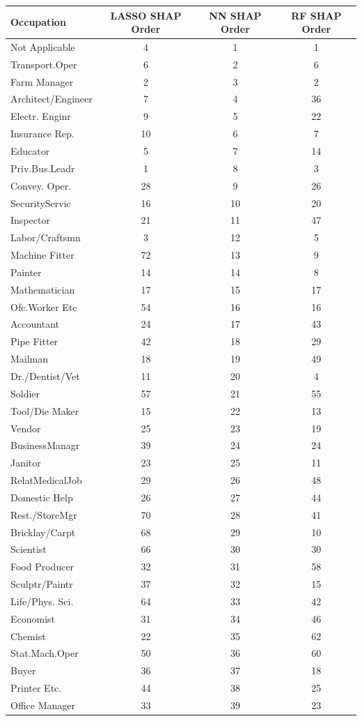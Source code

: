 \begin{tabular}{lccc}
\hline\hline
Occupation & LASSO SHAP Order & NN SHAP Order & RF SHAP Order \\
\hline
Not Applicable&4&1&1\\
Transport.Oper&6&2&6\\
Farm Manager&2&3&2\\
Architect/Engineer&7&4&36\\
Electr. Enginr&9&5&22\\
Insurance Rep.&10&6&7\\
Educator&5&7&14\\
Priv.Bus.Leadr&1&8&3\\
Convey. Oper.&28&9&26\\
SecurityServic&16&10&20\\
Inspector&21&11&47\\
Labor/Craftsmn&3&12&5\\
Machine Fitter&72&13&9\\
Painter&14&14&8\\
Mathematician&17&15&17\\
Ofc.Worker Etc&54&16&16\\
Accountant&24&17&43\\
Pipe Fitter&42&18&29\\
Mailman&18&19&49\\
Dr./Dentist/Vet&11&20&4\\
Soldier&57&21&55\\
Tool/Die Maker&15&22&13\\
Vendor&25&23&19\\
BusinessManagr&39&24&24\\
Janitor&23&25&11\\
RelatMedicalJob&29&26&48\\
Domestic Help&26&27&44\\
Rest./StoreMgr&70&28&41\\
Bricklay/Carpt&68&29&10\\
Scientist&66&30&30\\
Food Producer&32&31&58\\
Sculptr/Paintr&37&32&15\\
Life/Phys. Sci.&64&33&42\\
Economist&31&34&46\\
Chemist&22&35&62\\
Stat.Mach.Oper&50&36&60\\
Buyer&36&37&18\\
Printer Etc.&44&38&25\\
Office Manager&33&39&23\\

\end{tabular}
